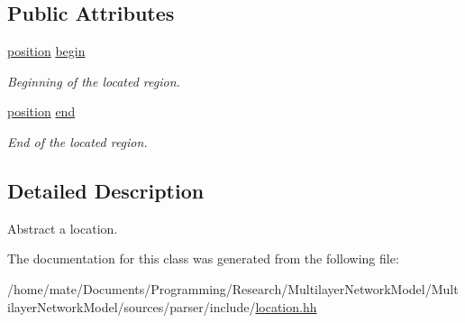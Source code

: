 \subsection*{Public Attributes}
\begin{DoxyCompactItemize}
\item 
\hyperlink{classEquationParser_1_1position}{position} \hyperlink{classEquationParser_1_1location_aa1fdd6decfaa33b12c14a71895c6c5cb}{begin}\hypertarget{classEquationParser_1_1location_aa1fdd6decfaa33b12c14a71895c6c5cb}{}\label{classEquationParser_1_1location_aa1fdd6decfaa33b12c14a71895c6c5cb}

\begin{DoxyCompactList}\small\item\em Beginning of the located region. \end{DoxyCompactList}\item 
\hyperlink{classEquationParser_1_1position}{position} \hyperlink{classEquationParser_1_1location_a6399485d967cdee3a129a748a2b385f7}{end}\hypertarget{classEquationParser_1_1location_a6399485d967cdee3a129a748a2b385f7}{}\label{classEquationParser_1_1location_a6399485d967cdee3a129a748a2b385f7}

\begin{DoxyCompactList}\small\item\em End of the located region. \end{DoxyCompactList}\end{DoxyCompactItemize}


\subsection{Detailed Description}
Abstract a location. 

The documentation for this class was generated from the following file\+:\begin{DoxyCompactItemize}
\item 
/home/mate/\+Documents/\+Programming/\+Research/\+Multilayer\+Network\+Model/\+Multilayer\+Network\+Model/sources/parser/include/\hyperlink{location_8hh}{location.\+hh}\end{DoxyCompactItemize}
